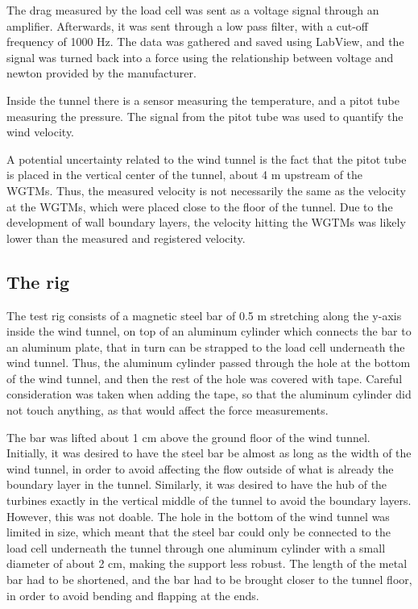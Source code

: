 The drag measured by the load cell was sent as a voltage signal through an amplifier. Afterwards, it was sent through a low pass filter, with a cut-off frequency of 1000 Hz. The data was gathered and saved using LabView, and the signal was turned back into a force using the relationship between voltage and newton provided by the manufacturer. 

Inside the tunnel there is a sensor measuring the temperature, and a pitot tube measuring the pressure. The signal from the pitot tube was used to quantify the wind velocity. 
% 

A potential uncertainty related to the wind tunnel is the fact that the pitot tube is placed in the vertical center of the tunnel, about 4 \si{\m} upstream of the \gls{WGTM}s. Thus, the measured velocity is not necessarily the same as the velocity at the \gls{WGTM}s, which were placed close to the floor of the tunnel. Due to the development of wall boundary layers, the velocity hitting the \gls{WGTM}s was likely lower than the measured and registered velocity. 


\subsection{The rig} 
The test rig consists of a magnetic steel bar of 0.5 \si{\m} stretching along the y-axis inside the wind tunnel, on top of an aluminum cylinder which connects the bar to an aluminum plate, that in turn can be strapped to the load cell underneath the wind tunnel. Thus, the aluminum cylinder passed through the hole at the bottom of the wind tunnel, and then the rest of the hole was covered with tape. Careful consideration was taken when adding the tape, so that the aluminum cylinder did not touch anything, as that would affect the force measurements. 

The bar was lifted about 1 \si{\cm} above the ground floor of the wind tunnel. Initially, it was desired to have the steel bar be almost as long as the width of the wind tunnel, in order to avoid affecting the flow outside of what is already the boundary layer in the tunnel. Similarly, it was desired to have the hub of the turbines exactly in the vertical middle of the tunnel to avoid the boundary layers. However, this was not doable. The hole in the bottom of the wind tunnel was limited in size, which meant that the steel bar could only be connected to the load cell underneath the tunnel through one aluminum cylinder with a small diameter of about 2 \si{\cm}, making the support less robust. The length of the metal bar had to be shortened, and the bar had to be brought closer to the tunnel floor, in order to avoid bending and flapping at the ends.






